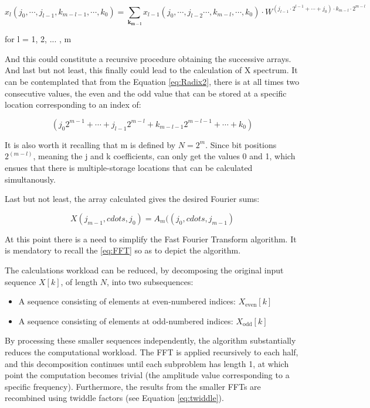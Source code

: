 {\begin{equation}
	x_{l}(j_0, \cdots, j_{l-1} , k_{m-l-1} , \cdots, k_0) = \sum_{\mathbf{k_{m-l}}} x_{l-1}(j_0, \cdots , j_{l-2} \cdots, k_{m-l} , \cdots , k_0) \cdot  W^{(j_{l-1} \cdot 2^{l-1} + \cdots + j_0) \cdot k_{m-l} \cdot 2^{m-l}}
	\label{eq:Radix2}
\end{equation}

for l = 1, 2, ... , m

And this could constitute a recursive procedure obtaining the successive arrays. And last but not least, this finally could lead to the calculation of X spectrum. It can be contemplated that from the Equation \eqref{eq:Radix2}, there is at all times two consecutive values, the even and the odd value that can be stored at a specific location corresponding to an index of: 

\begin{equation}
	(j_0 2^{m-1} + \cdots + j_{l-1} 2^{m-l} +  k_{m-l-1} 2^{m-l-1} + \cdots + k_0)
\end{equation}

It is also worth it recalling that m is defined by \( N = 2^m \). Since bit positions \( 2^(m-l) \), meaning the j and k coefficients, can only get the values 0 and 1, which ensues that there is multiple-storage locations that can be calculated simultanously.

Last but not least, the array calculated gives the desired Fourier sums: 

\begin{equation}
	X(j_{m-1}, cdots, j_0) = A_{m}((j_0 , cdots , j_{m-1})
\end{equation}


At this point there is a need to simplify the Fast Fourier Transform algorithm. It is mendatory to recall the \eqref{eq:FFT} so as to depict the algorithm. 

The calculations workload can be reduced, by decomposing the original input sequence \( X[k] \), of length \( N \), into two subsequences:

\begin{itemize}
    \item A sequence consisting of elements at even-numbered indices: \( X_{\text{even}}[k] \)
    \item A sequence consisting of elements at odd-numbered indices: \( X_{\text{odd}}[k] \)
\end{itemize}

By processing these smaller sequences independently, the algorithm substantially reduces the computational workload. The FFT is applied recursively to each half, and this decomposition continues until each subproblem has length 1, at which point the computation becomes trivial (the amplitude value corresponding to a specific frequency). Furthermore, the results from the smaller FFTs are recombined using twiddle factors (see Equation \eqref{eq:twiddle}).

}
